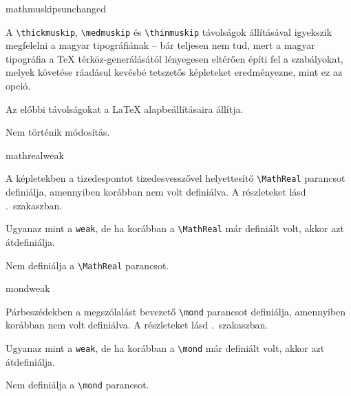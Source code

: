 \documentclass[12pt]{article}
\begin{document}
\begin{description}
\begin{hunopt}{mathmuskips}{unchanged}
\item[hu]
A \verb|\thickmuskip|, \verb|\medmuskip| és \verb|\thinmuskip| távolságok állításával igyekszik megfelelni a magyar tipográfiának -- bár teljesen nem tud, mert a magyar tipográfia a \TeX{} térköz-generálásától lényegesen eltérően építi fel a szabályokat, melyek követése ráadásul kevésbé tetszetős képleteket eredményezne, mint ez az opció.
\item[latex]
Az előbbi távolságokat a \LaTeX{} alapbeállításaira állítja.
\item[unchanged]
Nem történik módosítás.
\end{hunopt}

\begin{hunopt}{mathreal}{weak}
\item[weak]
A képletekben a tizedespontot tizedesvesszővel helyettesítő \verb|\MathReal| parancsot definiálja, amennyiben korábban nem volt definiálva.
A részleteket lásd .~szakaszban.
\item[yes]
Ugyanaz mint a \texttt{weak}, de ha korábban a \verb|\MathReal| már definiált volt, akkor azt átdefiniálja.
\item[no]
Nem definiálja a \verb|\MathReal| parancsot.
\end{hunopt}

\begin{hunopt}{mond}{weak}
\item[weak]
Párbeszédekben a megszólalást bevezető \verb|\mond| parancsot definiálja, amennyiben korábban nem volt definiálva.
A részleteket lásd .~szakaszban.
\item[yes]
Ugyanaz mint a \texttt{weak}, de ha korábban a \verb|\mond| már definiált volt, akkor azt átdefiniálja.
\item[no]
Nem definiálja a \verb|\mond| parancsot.
\end{hunopt}


\end{description}
\end{document}
